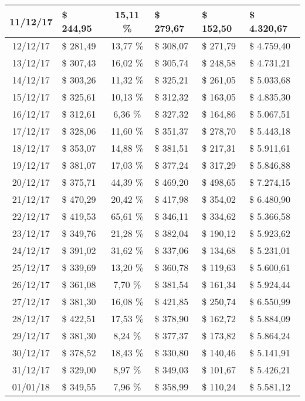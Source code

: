 \begin{center}
\begin{small}
\begin{longtable}{|c|l|c|l|l|l|}
11/12/17 & \$ 244,95 & 15,11 \% & \$ 279,67 & \$ 152,50 & \$ 4.320,67 \\ \hline
12/12/17 & \$ 281,49 & 13,77 \% & \$ 308,07 & \$ 271,79 & \$ 4.759,40 \\ \hline
13/12/17 & \$ 307,43 & 16,02 \% & \$ 305,74 & \$ 248,58 & \$ 4.731,21 \\ \hline
14/12/17 & \$ 303,26 & 11,32 \% & \$ 325,21 & \$ 261,05 & \$ 5.033,68 \\ \hline
15/12/17 & \$ 325,61 & 10,13 \% & \$ 312,32 & \$ 163,05 & \$ 4.835,30 \\ \hline
16/12/17 & \$ 312,61 & 6,36 \% & \$ 327,32 & \$ 164,86 & \$ 5.067,51 \\ \hline
17/12/17 & \$ 328,06 & 11,60 \% & \$ 351,37 & \$ 278,70 & \$ 5.443,18 \\ \hline
18/12/17 & \$ 353,07 & 14,88 \% & \$ 381,51 & \$ 217,31 & \$ 5.911,61 \\ \hline
19/12/17 & \$ 381,07 & 17,03 \% & \$ 377,24 & \$ 317,29 & \$ 5.846,88 \\ \hline
20/12/17 & \$ 375,71 & 44,39 \% & \$ 469,20 & \$ 498,65 & \$ 7.274,15 \\ \hline
21/12/17 & \$ 470,29 & 20,42 \% & \$ 417,98 & \$ 354,02 & \$ 6.480,90 \\ \hline
22/12/17 & \$ 419,53 & 65,61 \% & \$ 346,11 & \$ 334,62 & \$ 5.366,58 \\ \hline
23/12/17 & \$ 349,76 & 21,28 \% & \$ 382,04 & \$ 190,12 & \$ 5.923,62 \\ \hline
24/12/17 & \$ 391,02 & 31,62 \% & \$ 337,06 & \$ 134,68 & \$ 5.231,01 \\ \hline
25/12/17 & \$ 339,69 & 13,20 \% & \$ 360,78 & \$ 119,63 & \$ 5.600,61 \\ \hline
26/12/17 & \$ 361,08 & 7,70 \% & \$ 381,54 & \$ 161,34 & \$ 5.924,44 \\ \hline
27/12/17 & \$ 381,30 & 16,08 \% & \$ 421,85 & \$ 250,74 & \$ 6.550,99 \\ \hline
28/12/17 & \$ 422,51 & 17,53 \% & \$ 378,90 & \$ 162,72 & \$ 5.884,09 \\ \hline
29/12/17 & \$ 381,30 & 8,24 \% & \$ 377,37 & \$ 173,82 & \$ 5.864,24 \\ \hline
30/12/17 & \$ 378,52 & 18,43 \% & \$ 330,80 & \$ 140,46 & \$ 5.141,91 \\ \hline
31/12/17 & \$ 329,00 & 8,97 \% & \$ 349,03 & \$ 101,67 & \$ 5.426,21 \\ \hline
01/01/18 & \$ 349,55 & 7,96 \% & \$ 358,99 & \$ 110,24 & \$ 5.581,12 \\ \hline

\end{longtable}
\end{small}
\end{center}
